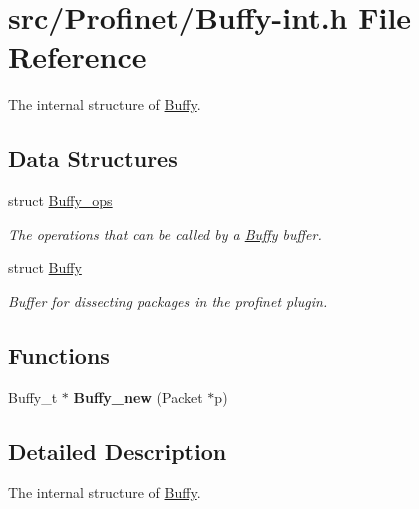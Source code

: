 \hypertarget{_buffy-int_8h}{\section{src/\-Profinet/\-Buffy-\/int.h File Reference}
\label{_buffy-int_8h}
}


The internal structure of \hyperlink{struct_buffy}{Buffy}.  


\subsection*{Data Structures}
\begin{DoxyCompactItemize}
\item 
struct \hyperlink{struct_buffy__ops}{Buffy\-\_\-ops}
\begin{DoxyCompactList}\small\item\em The operations that can be called by a \hyperlink{struct_buffy}{Buffy} buffer. \end{DoxyCompactList}\item 
struct \hyperlink{struct_buffy}{Buffy}
\begin{DoxyCompactList}\small\item\em Buffer for dissecting packages in the profinet plugin. \end{DoxyCompactList}\end{DoxyCompactItemize}
\subsection*{Functions}
\begin{DoxyCompactItemize}
\item 
\hypertarget{_buffy-int_8h_a1274babfe9f124dab45c870ac6630496}{Buffy\-\_\-t $\ast$ {\bfseries Buffy\-\_\-new} (Packet $\ast$p)}\label{_buffy-int_8h_a1274babfe9f124dab45c870ac6630496}

\end{DoxyCompactItemize}


\subsection{Detailed Description}
The internal structure of \hyperlink{struct_buffy}{Buffy}. 